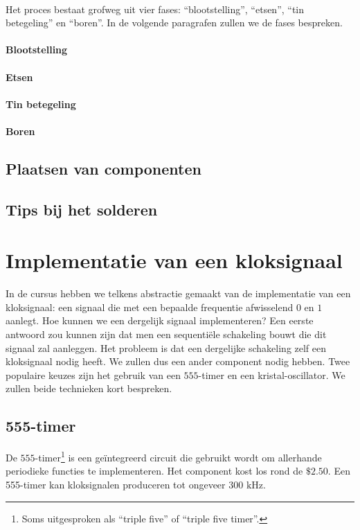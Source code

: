 \paragraph{}
Het proces bestaat grofweg uit vier fases: ``blootstelling'', ``etsen'', ``tin betegeling'' en ``boren''\cite[p. 69]{fabricatingprintedcircuitboards}. In de volgende paragrafen zullen we de fases bespreken.
\paragraph{Blootstelling}
\paragraph{Etsen}
\paragraph{Tin betegeling}
\paragraph{Boren}
\subsection{Plaatsen van componenten}
\subsection{Tips bij het solderen}
\section{Implementatie van een kloksignaal}
In de cursus hebben we telkens abstractie gemaakt van de implementatie van een kloksignaal: een signaal die met een bepaalde frequentie afwisselend $0$ en $1$ aanlegt. Hoe kunnen we een dergelijk signaal implementeren? Een eerste antwoord zou kunnen zijn dat men een sequenti\"ele schakeling bouwt die dit signaal zal aanleggen. Het probleem is dat een dergelijke schakeling zelf een kloksignaal nodig heeft. We zullen dus een ander component nodig hebben. Twee populaire keuzes zijn het gebruik van een $555$-timer en een kristal-oscillator. We zullen beide technieken kort bespreken.
\subsection{555-timer}
De $555$-timer\footnote{Soms uitgesproken als ``triple five'' of ``triple five timer''.} is een ge\"integreerd circuit die gebruikt wordt om allerhande periodieke functies te implementeren. Het component kost los rond de $\$ 2.50$. Een 555-timer kan kloksignalen produceren tot ongeveer $300\mbox{ kHz}$.
